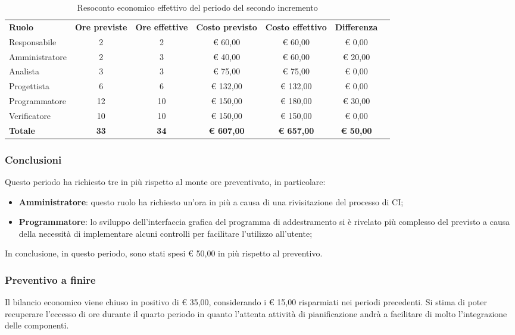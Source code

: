 \documentclass[../piano-di-progetto.tex]{subfiles}
\begin{document}
  \begin{table}[H]
    \centering
    \begin{tabular}{lcccccc}
      \rowcolor{lightgray}
      \textbf{Ruolo}  & \textbf{Ore previste} & \textbf{Ore effettive} & \textbf{Costo previsto} & \textbf{Costo effettivo} & \textbf{Differenza} \\
Responsabile    & 2           & 2           & € 60,00           & € 60,00            & € 0,00           \\
Amministratore  & 2           & 3           & € 40,00           & € 60,00           & € 20,00          \\
Analista        & 3           & 3           & € 75,00           & € 75,00            & € 0,00           \\
Progettista     & 6           & 6           & € 132,00          & € 132,00            & € 0,00           \\
Programmatore   & 12          & 10          & € 150,00          & € 180,00          & € 30,00          \\
Verificatore    & 10          & 10          & € 150,00          & € 150,00            & € 0,00           \\
\textbf{Totale} & \textbf{33} & \textbf{34} & \textbf{€ 607,00} & \textbf{€ 657,00} & \textbf{€ 50,00}

    \end{tabular}
    \caption{Resoconto economico effettivo del periodo del secondo incremento}
  \end{table}


\subsubsection{Conclusioni}
Questo periodo ha richiesto tre in più rispetto al monte ore preventivato, in particolare:
\begin{itemize}
    \item \textbf{Amministratore}: questo ruolo ha richiesto un'ora in più a causa di una rivisitazione del processo di CI;
    \item \textbf{Programmatore}: lo sviluppo dell'interfaccia grafica del programma di addestramento si è rivelato più complesso del previsto a causa della necessità di implementare alcuni controlli per facilitare l'utilizzo all'utente;
\end{itemize}
In conclusione, in questo periodo, sono stati spesi € 50,00 in più rispetto al preventivo.

\subsubsection{Preventivo a finire}
Il bilancio economico viene chiuso in positivo di € 35,00, considerando i € 15,00 risparmiati nei periodi precedenti. Si stima di poter recuperare l'eccesso di ore durante il quarto periodo in quanto l'attenta attività di pianificazione andrà a facilitare di molto l'integrazione delle componenti. 
\end{document}
